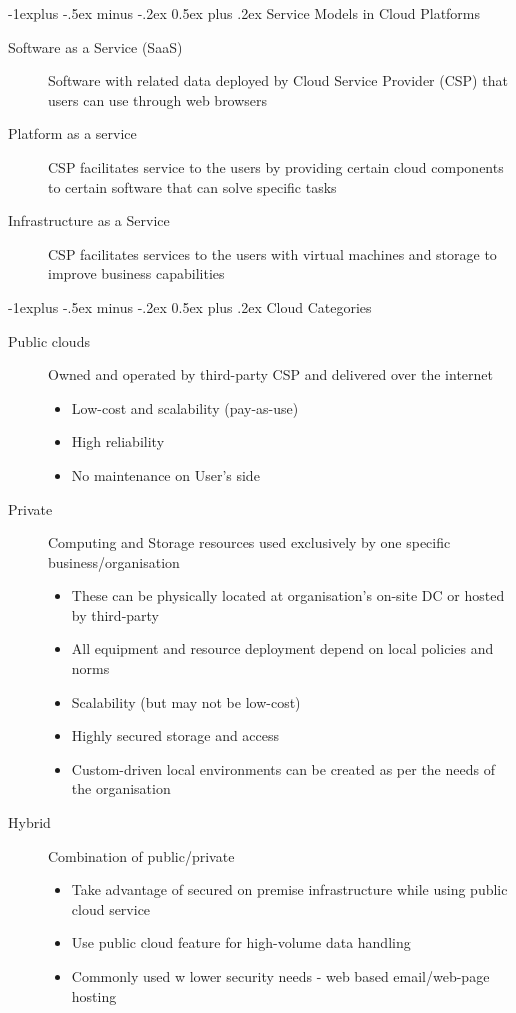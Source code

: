 \documentclass{article}
\makeatletter
\renewcommand{\subsection}{\@startsection{subsection}{2}{0mm}%
    {-1explus -.5ex minus -.2ex}%
    {0.5ex plus .2ex}%
{\normalfont\normalsize\bfseries}}
\makeatother
\begin{document}
\begin{multicols*}{3}
\subsection{Service Models in Cloud Platforms}
\begin{description}
	\item[Software as a Service (SaaS)]{Software with related data deployed by Cloud Service Provider (CSP) that users can use through web browsers}
	\item[Platform as a service]{CSP facilitates service to the users by providing certain cloud components to certain software that can solve specific tasks}
	\item[Infrastructure as a Service]{CSP facilitates services to the users with virtual machines and storage to improve business capabilities}
\end{description}
\subsection{Cloud Categories}
\begin{description}
	\item[Public clouds]{Owned and operated by third-party CSP and delivered over the internet}
	\begin{itemize}
		\item Low-cost and scalability (pay-as-use)
		\item High reliability
		\item No maintenance on User's side
	\end{itemize}
	\item[Private]{Computing and Storage resources used exclusively by one specific business/organisation}
	\begin{itemize}
		\item These can be physically located at organisation's on-site DC or hosted by third-party
		\item All equipment and resource deployment depend on local policies and norms
		\item Scalability (but may not be low-cost)
		\item Highly secured storage and access
		\item Custom-driven local environments can be created as per the needs of the organisation
	\end{itemize}
	\item[Hybrid]{Combination of public/private}
	\begin{itemize}
		\item Take advantage of secured on premise infrastructure while using public cloud service
		\item Use public cloud feature for high-volume data handling
		\item Commonly used w lower security needs - web based email/web-page hosting
	\end{itemize}
\end{description}

\end{multicols*}
\end{document}
